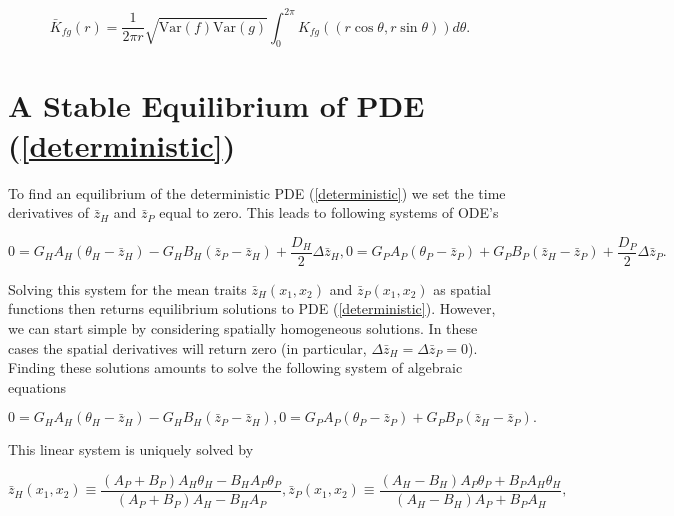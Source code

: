 \documentclass{article}
\begin{document}
\begin{equation}
  \bar K_{fg}(r)=\frac{1}{2\pi r}\sqrt{\mathrm{Var}(f)\mathrm{Var}(g)}\int_0^{2\pi}K_{fg}((r\cos\theta,r\sin\theta))d\theta.
\end{equation}

\hypertarget{a-stable-equilibrium-of-pde}{%
\section{\texorpdfstring{A Stable Equilibrium of PDE
(\ref{deterministic})}{A Stable Equilibrium of PDE ()}}\label{a-stable-equilibrium-of-pde}}

To find an equilibrium of the deterministic PDE (\ref{deterministic}) we
set the time derivatives of \(\bar z_H\) and \(\bar z_P\) equal to zero.
This leads to following systems of ODE's

\begin{subequations}
  \begin{equation}
    0=G_HA_H(\theta_H-\bar z_H)-G_HB_H(\bar z_P-\bar z_H)+\frac{D_H}{2}\Delta\bar z_H,
  \end{equation}
  \begin{equation}
    0=G_PA_P(\theta_P-\bar z_P)+G_PB_P(\bar z_H-\bar z_P)+\frac{D_P}{2}\Delta\bar z_P.
  \end{equation}
\end{subequations}

Solving this system for the mean traits \(\bar z_H(x_1,x_2)\) and
\(\bar z_P(x_1,x_2)\) as spatial functions then returns equilibrium
solutions to PDE (\ref{deterministic}). However, we can start simple by
considering spatially homogeneous solutions. In these cases the spatial
derivatives will return zero (in particular,
\(\Delta\bar z_H=\Delta\bar z_P=0\)). Finding these solutions amounts to
solve the following system of algebraic equations

\begin{subequations}
  \begin{equation}
    0=G_HA_H(\theta_H-\bar z_H)-G_HB_H(\bar z_P-\bar z_H),
  \end{equation}
  \begin{equation}
    0=G_PA_P(\theta_P-\bar z_P)+G_PB_P(\bar z_H-\bar z_P).
  \end{equation}
\end{subequations}

This linear system is uniquely solved by

\begin{subequations}\label{non-spatial-eq}
  \begin{equation}
    \bar z_H(x_1,x_2)\equiv\frac{(A_P+B_P)A_H\theta_H-B_HA_P\theta_P}{(A_P+B_P)A_H-B_HA_P},
  \end{equation}
  \begin{equation}
    \bar z_P(x_1,x_2)\equiv\frac{(A_H-B_H)A_P\theta_P+B_PA_H\theta_H}{(A_H-B_H)A_P+B_PA_H},
  \end{equation}
\end{subequations}
\end{document}

